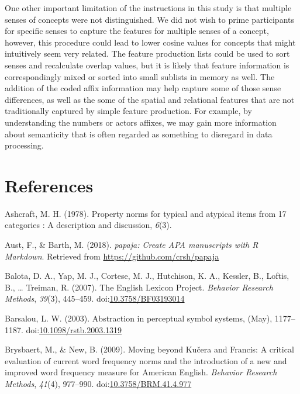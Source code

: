 \documentclass[english,man]{apa6}
\theoremstyle{definition}
\theoremstyle{definition}
\theoremstyle{definition}
\theoremstyle{remark}
\begin{document}
One other important limitation of the instructions in this study is that
multiple senses of concepts were not distinguished. We did not wish to
prime participants for specific senses to capture the features for
multiple senses of a concept, however, this procedure could lead to
lower cosine values for concepts that might intuitively seem very
related. The feature production lists could be used to sort senses and
recalculate overlap values, but it is likely that feature information is
correspondingly mixed or sorted into small sublists in memory as well.
The addition of the coded affix information may help capture some of
those sense differences, as well as the some of the spatial and
relational features that are not traditionally captured by simple
feature production. For example, by understanding the numbers or actors
affixes, we may gain more information about semanticity that is often
regarded as something to disregard in data processing.

\newpage

\section{References}\label{references}

\setlength{\parindent}{-0.5in} \setlength{\leftskip}{0.5in}

\hypertarget{refs}{}
\hypertarget{ref-Ashcraft1978}{}
Ashcraft, M. H. (1978). Property norms for typical and atypical items
from 17 categories : A description and discussion, \emph{6}(3).

\hypertarget{ref-R-papaja}{}
Aust, F., \& Barth, M. (2018). \emph{papaja: Create APA manuscripts with
R Markdown}. Retrieved from \url{https://github.com/crsh/papaja}

\hypertarget{ref-Balota2007}{}
Balota, D. A., Yap, M. J., Cortese, M. J., Hutchison, K. A., Kessler,
B., Loftis, B., \ldots{} Treiman, R. (2007). The English Lexicon
Project. \emph{Behavior Research Methods}, \emph{39}(3), 445--459.
doi:\href{https://doi.org/10.3758/BF03193014}{10.3758/BF03193014}

\hypertarget{ref-Barsalou2003}{}
Barsalou, L. W. (2003). Abstraction in perceptual symbol systems, (May),
1177--1187.
doi:\href{https://doi.org/10.1098/rstb.2003.1319}{10.1098/rstb.2003.1319}

\hypertarget{ref-Brysbaert2009}{}
Brysbaert, M., \& New, B. (2009). Moving beyond Kučera and Francis: A
critical evaluation of current word frequency norms and the introduction
of a new and improved word frequency measure for American English.
\emph{Behavior Research Methods}, \emph{41}(4), 977--990.
doi:\href{https://doi.org/10.3758/BRM.41.4.977}{10.3758/BRM.41.4.977}
\end{document}
